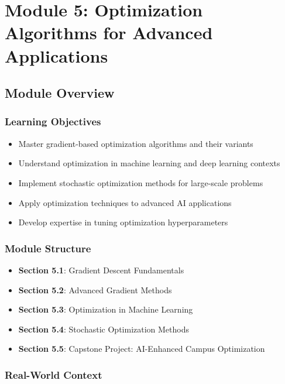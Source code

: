 \documentclass[
  letterpaper,
  DIV=11,
  numbers=noendperiod]{scrreprt}
\providecommand{\tightlist}{%
  \setlength{\itemsep}{0pt}\setlength{\parskip}{0pt}}
\begin{document}

\chapter{Module 5: Optimization Algorithms for Advanced
Applications}\label{module-5-optimization-algorithms-for-advanced-applications}

\section{Module Overview}\label{module-overview-4}

\subsection{Learning Objectives}\label{learning-objectives-5}

\begin{itemize}
\tightlist
\item
  Master gradient-based optimization algorithms and their variants
\item
  Understand optimization in machine learning and deep learning contexts
\item
  Implement stochastic optimization methods for large-scale problems
\item
  Apply optimization techniques to advanced AI applications
\item
  Develop expertise in tuning optimization hyperparameters
\end{itemize}

\subsection{Module Structure}\label{module-structure-3}

\begin{itemize}
\tightlist
\item
  \textbf{Section 5.1}: Gradient Descent Fundamentals
\item
  \textbf{Section 5.2}: Advanced Gradient Methods
\item
  \textbf{Section 5.3}: Optimization in Machine Learning
\item
  \textbf{Section 5.4}: Stochastic Optimization Methods
\item
  \textbf{Section 5.5}: Capstone Project: AI-Enhanced Campus
  Optimization
\end{itemize}

\subsection{Real-World Context}\label{real-world-context-3}
\end{document}
